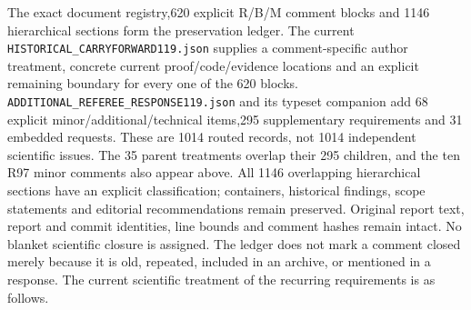 The exact document registry,620 explicit R/B/M comment blocks and 1146 hierarchical sections form the preservation ledger. The current \nolinkurl{HISTORICAL_CARRYFORWARD119.json} supplies a comment-specific author treatment, concrete current proof/code/evidence locations and an explicit remaining boundary for every one of the 620 blocks. \nolinkurl{ADDITIONAL_REFEREE_RESPONSE119.json} and its typeset companion add 68 explicit minor/additional/technical items,295 supplementary requirements and 31 embedded requests. These are 1014 routed records, not 1014 independent scientific issues. The 35 parent treatments overlap their 295 children, and the ten R97 minor comments also appear above. All 1146 overlapping hierarchical sections have an explicit classification; containers, historical findings, scope statements and editorial recommendations remain preserved. Original report text, report and commit identities, line bounds and comment hashes remain intact. No blanket scientific closure is assigned. The ledger does not mark a comment closed merely because it is old, repeated, included in an archive, or mentioned in a response. The current scientific treatment of the recurring requirements is as follows.

